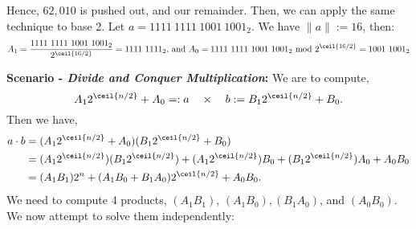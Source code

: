 \noindent
Hence, $62,010$ is pushed out, and our remainder. Then, we can apply the same technique to base 2.
Let $a=1111\ 1111\ 1001\ 1001_2$. We have $\|a\|:=16$, then:
\[ A_1=\frac{1111\ 1111\ 1001\ 1001_2}{2^{\ceil{16/2}}}=1111\ 1111_2 \text{, and } A_0=1111\ 1111\ 1001\ 1001_2 \text{ mod } 2^{\ceil{16/2}}=1001\ 1001_2 \]

\newpage
\noindent
\textbf{Scenario - \textit{Divide and Conquer Multiplication}:} We are to compute, 
\[A_1 2^{\ceil{n/2}}+A_0=:a \quad \times \quad b:= B_1 2^{\ceil{n/2}}+B_0.\]
\noindent
Then we have,
\begin{align*}
    a\cdot b &=(A_1 2^{\ceil{n/2}}+A_0)(B_1 2^{\ceil{n/2}}+B_0)\\
    &=(A_1 2^{\ceil{n/2}})(B_1 2^{\ceil{n/2}})+(A_1 2^{\ceil{n/2}})B_0+(B_1 2^{\ceil{n/2}})A_0+A_0B_0\\
    &=(A_1B_1)2^{n}+(A_1B_0+B_1A_0)2^{\ceil{n/2}}+A_0B_0.
\end{align*}
\noindent
We need to compute 4 products, $(A_1B_1)$, $(A_1B_0), (B_1A_0)$, and $(A_0B_0)$. We now attempt to solve them independently:

